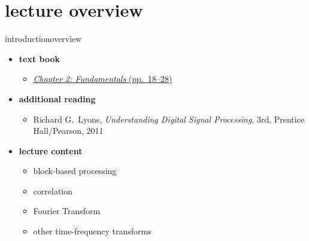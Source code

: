 

\subtitle{Part 3.2: Fundamentals II}


	

    \section[overview]{lecture overview}
        \begin{frame}{introduction}{overview}
            \begin{itemize}
                \item   \textbf{text book}  
                    \begin{itemize}
                        \item   \href{http://ieeexplore.ieee.org/xpl/articleDetails.jsp?tp=&arnumber=6331119&}{\underline{\textit{Chapter 2: Fundamentals} (pp.~18--28)}}
                    \end{itemize}
                \item   \textbf{additional reading}  
                    \begin{itemize}
                        \item   Richard G.~Lyons, \textit{Understanding Digital Signal Processing}, 3rd, Prentice Hall/Pearson, 2011
                    \end{itemize}
                \bigskip
                \item<2->   \textbf{lecture content}
                    \begin{itemize}
                        \item<2->   block-based processing
                        \item<3->   correlation
                        \item<4->   Fourier Transform
                        \item<5->   other time-frequency transforms
                    \end{itemize}
            \end{itemize}
        \end{frame}

